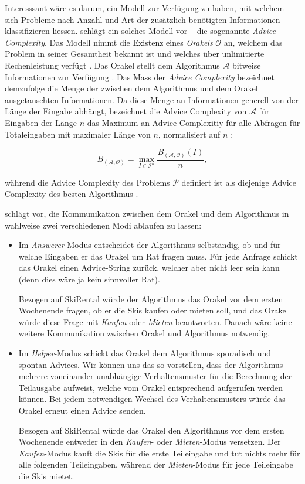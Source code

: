 \documentclass[11pt,abstracton]{scrreprt} %
\theoremstyle{definition}
\begin{document}
\bigskip
Interesssant wäre es darum, ein Modell zur Verfügung zu haben, mit welchem sich Probleme nach Anzahl und Art der zusätzlich benötigten Informationen klassifizieren liessen. \cite{Dobrev} schlägt ein solches Modell vor \cite{BKK} -- die sogenannte {\sl Advice Complexity}. Das Modell nimmt die Existenz eines {\sl Orakels} $\mathcal{O}$ an, welchem das Problem in seiner Gesamtheit bekannt ist und welches über unlimitierte Rechenleistung verfügt \cite{Dobrev, BKK}. Das Orakel stellt dem Algorithmus $\mathcal{A}$ bitweise Informationen zur Verfügung \cite{Dobrev}. Das Mass der {\sl Advice Complexity} bezeichnet demzufolge die Menge der zwischen dem Algorithmus und dem Orakel ausgetauschten Informationen. Da diese Menge an Informationen generell von der Länge der Eingabe abhängt, bezeichnet die Advice Complexity von $\mathcal{A}$ für Eingaben der Länge $n$ das Maximum an Advice Complexitiy für alle Abfragen für Totaleingaben mit maximaler Länge von $n$, normalisiert auf $n$ \cite{BKK}:

\[
	B_{(\mathcal{A}, \mathcal{O})} = \max_{I \in \mathcal{I}^n} \frac { B_{(\mathcal{A}, \mathcal{O})}(I) }{n},
\]

während die Advice Complexity des Problems $\mathcal{P}$ definiert ist als diejenige Advice Complexity des besten Algorithmus \cite{bipartite}.

\bigskip

\cite{Dobrev} schlägt vor, die Kommunikation zwischen dem Orakel und dem Algorithmus in wahlweise zwei verschiedenen Modi ablaufen zu lassen:

\begin{itemize}
\item Im {\sl Answerer}-Modus entscheidet der Algorithmus selbständig, ob und für welche Eingaben er das Orakel um Rat fragen muss. Für jede Anfrage schickt das Orakel einen Advice-String zurück, welcher aber nicht leer sein kann \cite{Dobrev} (denn dies wäre ja kein sinnvoller Rat).

Bezogen auf {\sc SkiRental} würde der Algorithmus das Orakel vor dem ersten Wochenende fragen, ob er die Skis kaufen oder mieten soll, und das Orakel würde diese Frage mit {\sl Kaufen} oder {\sl Mieten} beantworten. Danach wäre keine weitere Kommunikation zwischen Orakel und Algorithmus notwendig.

\item Im {\sl Helper}-Modus schickt das Orakel dem Algorithmus sporadisch und spontan Advices. Wir können uns das so vorstellen, dass der Algorithmus mehrere voneinander unabhängige Verhaltensmuster für die Berechnung der Teilausgabe aufweist, welche vom Orakel entsprechend aufgerufen werden können. Bei jedem notwendigen Wechsel des Verhaltensmusters würde das Orakel erneut einen Advice senden.

Bezogen auf {\sc SkiRental} würde das Orakel den Algorithmus vor dem ersten Wochenende entweder in den {\sl Kaufen}- oder {\sl Mieten}-Modus versetzen. Der {\sl Kaufen}-Modus kauft die Skis für die erste Teileingabe und tut nichts mehr für alle folgenden Teileingaben, während der {\sl Mieten}-Modus für jede Teileingabe die Skis mietet.
\end{itemize}
\end{document}
